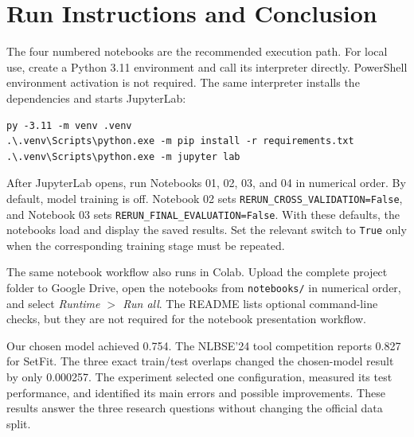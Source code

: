 \documentclass[11pt,a4paper]{article}
\begin{document}
\section{Run Instructions and Conclusion}

The four numbered notebooks are the recommended execution path. For local use,
create a Python 3.11 environment and call its interpreter directly. PowerShell
environment activation is not required. The same interpreter installs the
dependencies and starts JupyterLab:

\begin{verbatim}
py -3.11 -m venv .venv
.\.venv\Scripts\python.exe -m pip install -r requirements.txt
.\.venv\Scripts\python.exe -m jupyter lab
\end{verbatim}

After JupyterLab opens, run Notebooks 01, 02, 03, and 04 in numerical order.
By default, model training is off. Notebook 02 sets
\texttt{RERUN\_CROSS\_VALIDATION=False}, and Notebook 03 sets
\texttt{RERUN\_FINAL\_EVALUATION=False}. With these defaults, the notebooks
load and display the saved results. Set the relevant switch to \texttt{True}
only when the corresponding training stage must be repeated.

The same notebook workflow also runs in Colab. Upload the complete project
folder to Google Drive, open the notebooks from \texttt{notebooks/} in
numerical order, and select \emph{Runtime $>$ Run all}. The README lists
optional command-line checks, but they are not required for the notebook
presentation workflow.

Our chosen model achieved 0.754. The NLBSE'24 tool competition reports 0.827
for SetFit. The three exact train/test overlaps changed the chosen-model result
by only 0.000257. The experiment selected one configuration, measured its test
performance, and identified its main errors and possible improvements. These
results answer the three research questions without changing the official data
split.

\clearpage


\end{document}
